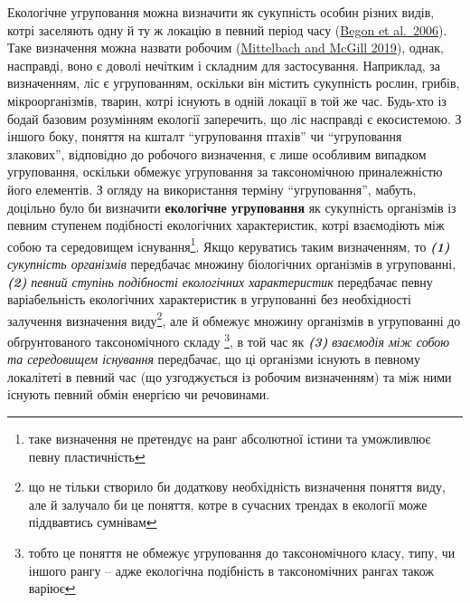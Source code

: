 \documentclass[
  11pt,
]{book}
\begin{document}
Екологічне угруповання можна визначити як сукупність особин різних видів, котрі заселяють одну й ту ж локацію в певний період часу (\href{https://scholar.google.com/scholar_lookup?title=Ecology\%3A\%20From\%20Individuals\%20to\%20Ecosystems&author=\%20&author=\%20&author=\%20&publication_year=2006&book=Ecology\%3A\%20From\%20Individuals\%20to\%20Ecosystems}{Begon et al.~2006}). Таке визначення можна назвати робочим (\href{https://doi.org/10.1093/oso/9780198835851.001.0001}{Mittelbach and McGill 2019}), однак, насправді, воно є доволі нечітким і складним для застосування. Наприклад, за визначенням, ліс є угрупованням, оскільки він містить сукупність рослин, грибів, мікроорганізмів, тварин, котрі існують в одній локації в той же час. Будь-хто із бодай базовим розумінням екології заперечить, що ліс насправді є екосистемою. З іншого боку, поняття на кшталт ``угруповання птахів'' чи ``угруповання злакових'', відповідно до робочого визначення, є лише особливим випадком угруповання, оскільки обмежує угруповання за таксономічною приналежністю його елементів. З огляду на використання терміну ``угруповання'', мабуть, доцільно було би визначити \textbf{екологічне угруповання} як сукупність організмів із певним ступенем подібності екологічних характеристик, котрі взаємодіють між собою та середовищем існування\footnote{таке визначення не претендує на ранг абсолютної істини та уможливлює певну пластичність}. Якщо керуватись таким визначенням, то \textbf{\emph{(1)}} \emph{сукупність організмів} передбачає множину біологічних організмів в угрупованні, \textbf{\emph{(2)}} \emph{певний ступінь подібності екологічних характеристик} передбачає певну варіабельність екологічних характеристик в угрупованні без необхідності залучення визначення виду\footnote{що не тільки створило би додаткову необхідність визначення поняття виду, але й залучало би це поняття, котре в сучасних трендах в екології може піддвавтись сумнівам}, але й обмежує множину організмів в угрупованні до обґрунтованого таксономічного складу \footnote{тобто це поняття не обмежує угруповання до таксономічного класу, типу, чи іншого рангу -- адже екологічна подібність в таксономічних рангах також варіює}, в той час як \textbf{\emph{(3)}} \emph{взаємодія між собою та середовищем існування} передбачає, що ці організми існують в певному локалітеті в певний час (що узгоджується із робочим визначенням) та між ними існують певний обмін енергією чи речовинами.
\end{document}
